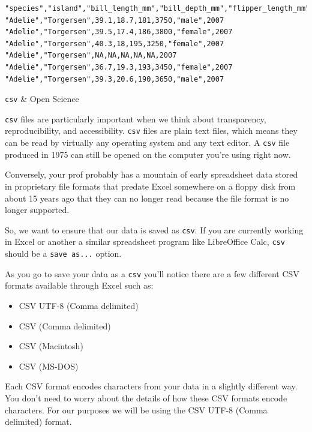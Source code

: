 \documentclass[
]{book}
\providecommand{\tightlist}{%
  \setlength{\itemsep}{0pt}\setlength{\parskip}{0pt}}
\begin{document}
\begin{verbatim}
"species","island","bill_length_mm","bill_depth_mm","flipper_length_mm","body_mass_g","sex","year"
"Adelie","Torgersen",39.1,18.7,181,3750,"male",2007
"Adelie","Torgersen",39.5,17.4,186,3800,"female",2007
"Adelie","Torgersen",40.3,18,195,3250,"female",2007
"Adelie","Torgersen",NA,NA,NA,NA,NA,2007
"Adelie","Torgersen",36.7,19.3,193,3450,"female",2007
"Adelie","Torgersen",39.3,20.6,190,3650,"male",2007
\end{verbatim}

\texttt{csv} \& Open Science

\texttt{csv} files are particularly important when we think about transparency, reproducibility, and accessibility. \texttt{csv} files are plain text files, which means they can be read by virtually any operating system and any text editor. A \texttt{csv} file produced in 1975 can still be opened on the computer you're using right now.

Conversely, your prof probably has a mountain of early spreadsheet data stored in proprietary file formats that predate Excel somewhere on a floppy disk from about 15 years ago that they can no longer read because the file format is no longer supported.

So, we want to ensure that our data is saved as \texttt{csv}. If you are currently working in Excel or another a similar spreadsheet program like LibreOffice Calc, \texttt{csv} should be a \texttt{save\ as...} option.

As you go to save your data as a \texttt{csv} you'll notice there are a few different CSV formats available through Excel such as:

\begin{itemize}
\tightlist
\item
  CSV UTF-8 (Comma delimited)
\item
  CSV (Comma delimited)
\item
  CSV (Macintosh)
\item
  CSV (MS-DOS)
\end{itemize}

Each CSV format encodes characters from your data in a slightly different way. You don't need to worry about the details of how these CSV formats encode characters. For our purposes we will be using the CSV UTF-8 (Comma delimited) format.
\end{document}
